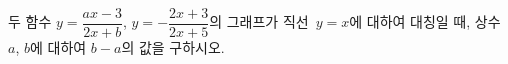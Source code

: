 두 함수 $y=\dfrac{ax-3}{2x+b}$, $y=-\dfrac{2x+3}{2x+5}$의 그래프가 직선~$y=x$에 대하여 대칭일 때, 상수 $a$, $b$에 대하여 $b-a$의 값을 구하시오.
